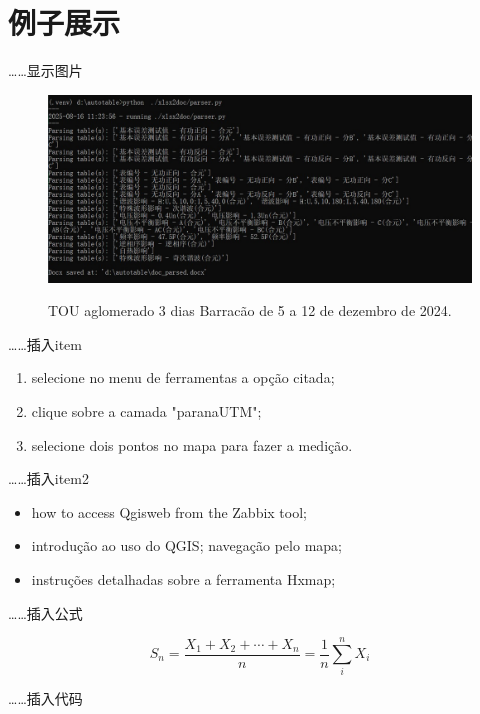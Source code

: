 \section{例子展示}

……显示图片
\begin{figure}[H]
    \begin{center}
        \includegraphics[width=.95\linewidth]{res/results.jpg}\\
        \caption{TOU aglomerado 3 dias Barracão de 5 a 12 de dezembro de 2024.}\label{01}
    \end{center}
\end{figure}

……插入item

\begin{enumerate}
    \item selecione no menu de ferramentas a opção citada;
    \item clique sobre a camada "paranaUTM";
    \item selecione dois pontos no mapa para fazer a medição.
\end{enumerate}

……插入item2

    \begin{itemize}
        \item how to access Qgisweb from the Zabbix tool;
        \item introdução ao uso do QGIS; navegação pelo mapa; 
        \item instruções detalhadas sobre a ferramenta Hxmap; 
    \end{itemize}

……插入公式

\[S_n = \frac{X_1 + X_2 + \cdots + X_n}{n}
      = \frac{1}{n}\sum_{i}^{n} X_i\]

……插入代码

